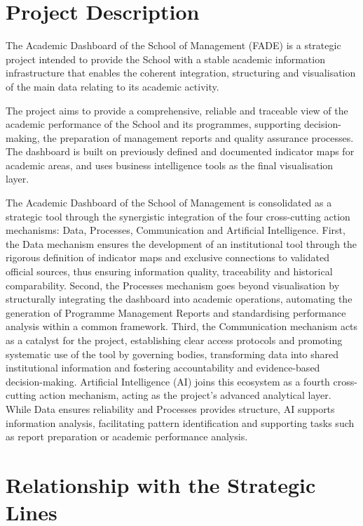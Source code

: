 \documentclass[11pt,a4paper]{scrreprt}
\begin{document}
\section{Project Description}

\small
The Academic Dashboard of the School of Management (FADE) is a strategic project intended to provide the School with a stable academic information infrastructure that enables the coherent integration, structuring and visualisation of the main data relating to its academic activity.

The project aims to provide a comprehensive, reliable and traceable view of the academic performance of the School and its programmes, supporting decision-making, the preparation of management reports and quality assurance processes. The dashboard is built on previously defined and documented indicator maps for academic areas, and uses business intelligence tools as the final visualisation layer.

The Academic Dashboard of the School of Management is consolidated as a strategic tool through the synergistic integration of the four cross-cutting action mechanisms: Data, Processes, Communication and Artificial Intelligence. First, the Data mechanism ensures the development of an institutional tool through the rigorous definition of indicator maps and exclusive connections to validated official sources, thus ensuring information quality, traceability and historical comparability. Second, the Processes mechanism goes beyond visualisation by structurally integrating the dashboard into academic operations, automating the generation of Programme Management Reports and standardising performance analysis within a common framework. Third, the Communication mechanism acts as a catalyst for the project, establishing clear access protocols and promoting systematic use of the tool by governing bodies, transforming data into shared institutional information and fostering accountability and evidence-based decision-making. Artificial Intelligence (AI) joins this ecosystem as a fourth cross-cutting action mechanism, acting as the project's advanced analytical layer. While Data ensures reliability and Processes provides structure, AI supports information analysis, facilitating pattern identification and supporting tasks such as report preparation or academic performance analysis.

\section{Relationship with the Strategic Lines}
\end{document}
